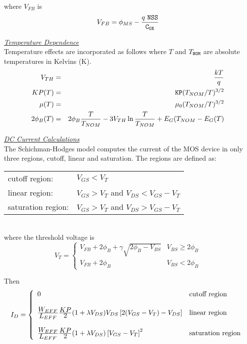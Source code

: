 \documentclass{article}
\newcommand{\PHI}{2\phi_{B}}
\newcommand{\GAMMA}{\gamma}
\newcommand{\LAMBDA}{\lambda}
\begin{document}
where $V_{FB}$ is
\begin{equation}
V_{FB} = \phi_{MS} - { q \ \tt {NSS} \over {C_{OX}}}
\end{equation}

\vfill \noindent\underline{\sl \large Temperature Dependence}
 
\\[0.1in]
Temperature effects are incorporated as follows where $T$ and
$T_{\tt{NOM}}$ are absolute temperatures in Kelvins (K).
\begin{eqnarray}
V_{TH} & = & {{kT} \over q}\\
KP(T) & = & {\tt KP}  (T_{NOM}/T)^{3/2} \\
\mu (T) & = & \mu_{0}  (T_{NOM}/T)^{3/2} \\
\PHI (T) & = & \PHI {T \over {T_{NOM}}} - 3V_{TH} \ln{{T \over
{T_{NOM}}}
 } + E_G (T_{NOM} -E_G(T)
\end{eqnarray}

\vfill \noindent\underline{\sl \large DC Current
Calculations}\\[0.1in]

\noindent The Schichman-Hodges model computes the current of the
MOS device in only three regions, cutoff, linear and saturation.
The regions are defined as:\\[0.1in]
\hspace*{\fill}\parbox{5in}{
\begin{tabular}{ll}
cutoff region:&$V_{GS} < V_T$\\
linear region:&$V_{GS} > V_T$ and $V_{DS} < V_{GS}-V_{T}$\\
saturation region:&$V_{GS} > V_T$ and $V_{DS} > V_{GS}-V_{T}$\\
\end{tabular}}\\[0.1in]
where the threshold voltage is
\begin{equation}
V_{T} = \left\{ \begin{array}{ll}
          V_{FB} + \PHI + \GAMMA \sqrt{\PHI - V_{BS}}
               & V_{BS} \ge \PHI \\
          V_{FB} + \PHI & V_{BS} < \PHI
          \end{array} \right. %
\end{equation}

\noindent Then
\begin{equation}
I_{D} = \left\{ \begin{array}{ll}
      0  & \mbox{cutoff region} \\ \\
      { {\textstyle W_{EFF}} \over {\textstyle L_{EFF}}}
      {{\textstyle KP} \over {\textstyle 2}}
      ( 1+\LAMBDA V_{DS})
      V_{DS} \left[2(V_{GS}-V_{T})-V_{DS}\right]
         &\mbox{linear region} \\ \\
      { {\textstyle W_{EFF}} \over {\textstyle L_{EFF}}}
      {{\textstyle KP} \over {\textstyle 2}}
      (1+\LAMBDA V_{DS})
      \left[V_{GS}-V_{T}\right]^2
         &\mbox{saturation region} \end{array} \right. %
      \label{mlevel1ids}
\end{equation}
\end{document}
